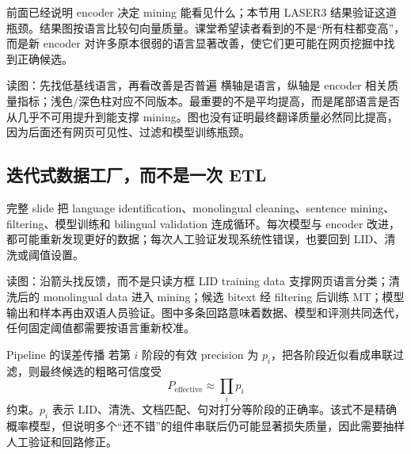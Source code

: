 前面已经说明 encoder 决定 mining 能看见什么；本节用 LASER3 结果验证这道瓶颈。结果图按语言比较句向量质量。课堂希望读者看到的不是“所有柱都变高”，而是新 encoder 对许多原本很弱的语言显著改善，使它们更可能在网页挖掘中找到正确候选。


\begin{knowledgebox}{读图：先找低基线语言，再看改善是否普遍}
横轴是语言，纵轴是 encoder 相关质量指标；浅色/深色柱对应不同版本。最重要的不是平均提高，而是尾部语言是否从几乎不可用提升到能支撑 mining。图也没有证明最终翻译质量必然同比提高，因为后面还有网页可见性、过滤和模型训练瓶颈。
\end{knowledgebox}


\subsection{迭代式数据工厂，而不是一次 ETL}

完整 slide 把 language identification、monolingual cleaning、sentence mining、filtering、模型训练和 bilingual validation 连成循环。每次模型与 encoder 改进，都可能重新发现更好的数据；每次人工验证发现系统性错误，也要回到 LID、清洗或阈值设置。


\begin{knowledgebox}{读图：沿箭头找反馈，而不是只读方框}
LID training data 支撑网页语言分类；清洗后的 monolingual data 进入 mining；候选 bitext 经 filtering 后训练 MT；模型输出和样本再由双语人员验证。图中多条回路意味着数据、模型和评测共同迭代，任何固定阈值都需要按语言重新校准。
\end{knowledgebox}

\begin{importantbox}{Pipeline 的误差传播}
若第 $i$ 阶段的有效 precision 为 $p_i$，把各阶段近似看成串联过滤，则最终候选的粗略可信度受
\[
P_{\text{effective}}\approx\prod_i p_i
\]
约束。$p_i$ 表示 LID、清洗、文档匹配、句对打分等阶段的正确率。该式不是精确概率模型，但说明多个“还不错”的组件串联后仍可能显著损失质量，因此需要抽样人工验证和回路修正。
\end{importantbox}

